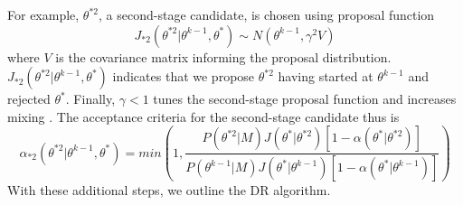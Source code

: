 For example, $\theta^{*2}$, a second-stage candidate, is chosen using proposal function
\begin{equation} \label{eq:17mcmc}
J_{*2}(\theta^{*2}|\theta^{k-1},\theta^*) \sim N(\theta^{k-1}, \gamma^2V)
\end{equation} 
where $V$ is the covariance matrix informing the proposal distribution. $J_{*2}(\theta^{*2}|\theta^{k-1},\theta^*)$ indicates that we propose $\theta^{*2}$ having started at $\theta^{k-1}$ and rejected $\theta^*$. Finally, $\gamma < 1$ tunes the second-stage proposal function and increases mixing \cite{smithCh8}. The acceptance criteria for the second-stage candidate thus is\\
\begin{equation} \label{eq:18mcmc}
\alpha_{*2}(\theta^{*2}|\theta^{k-1}, \theta^*) = min(1, \frac{P(\theta^{*2}|M)J(\theta^*|
    \theta^{*2})[1-\alpha(\theta^*|\theta^{*2})]}{P(\theta^{k-1}|M)J(\theta^*|\theta^{k-1})[1-\alpha(\theta^*|\theta^{k-1})]})
\end{equation}
With these additional steps, we outline the DR algorithm.
